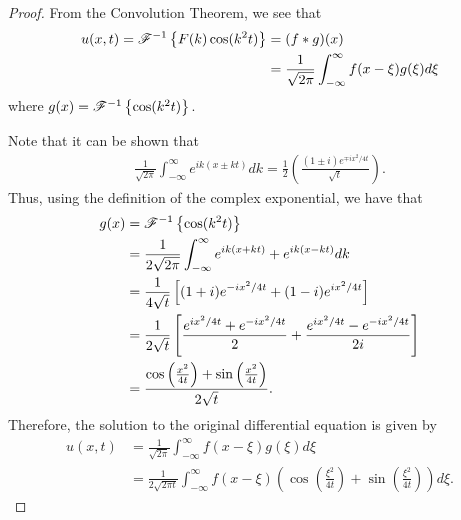 \begin{proof}
  From the Convolution Theorem, we see that
  \begin{align*}
    u(x,t) = \mathscr{F}^{-1}\left\{ {F(k)\cos(k^2 t)} \right\} &= (f \ast g)(x) \\
    &= \frac{1}{\sqrt{2\pi}} \int_{-\infty}^{\infty}f(x-\xi)g(\xi)d\xi
  \end{align*}
  where $g(x) = \mathscr{F}^{-1}\left\{ {\cos(k^2 t)} \right\}$.

  Note that it can be shown that
  \begin{align*}
    \frac{1}{\sqrt{2\pi}}\int_{-\infty}^{\infty} e^{ik(x \pm kt)}dk = \frac{1}{2}\left(\frac{(1\pm i)e^{\mp i x^2 / 4t}}{\sqrt{t}}\right).
  \end{align*}
  Thus, using the definition of the complex exponential, we have that
  \begin{align*}
    g(x) &= \mathscr{F}^{-1}\left\{ {\cos(k^2 t)} \right\} \\
    &= \frac{1}{2\sqrt{2\pi}}\int_{-\infty}^\infty e^{ik(x + kt)} + e^{ik(x - kt)}dk \\
    &= \frac{1}{4\sqrt{t}}\left[(1+i)e^{-ix^2/4t} + (1-i)e^{ix^2/4t}\right] \\
    &= \frac{1}{2\sqrt{t}}\left[\frac{e^{ix^2/4t} + e^{-ix^2/4t}}{2} + \frac{e^{ix^2/4t} - e^{-ix^2/4t}}{2i}\right] \\
    &= \frac{\cos\left(\frac{x^2}{4t}\right) + \sin\left(\frac{x^2}{4t}\right)}{2\sqrt{t}}.
  \end{align*}
  Therefore, the solution to the original differential equation is given by
  \begin{align*}
    u(x,t)
    &= \frac{1}{\sqrt{2\pi}} \int_{-\infty}^{\infty}f(x-\xi)g(\xi)d\xi \\
    &= \frac{1}{2\sqrt{2\pi t}} \int_{-\infty}^{\infty} f(x-\xi)\left(\cos\left(\frac{\xi^2}{4t}\right) + \sin\left(\frac{\xi^2}{4t}\right)\right) d\xi.
  \end{align*}

\end{proof}
\newpage
